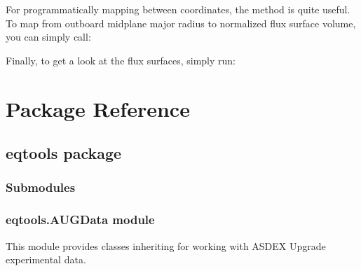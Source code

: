 \documentclass[letterpaper,10pt,english]{sphinxmanual}
\begin{document}
For programmatically mapping between coordinates, the {\hyperref[\detokenize{eqtools:eqtools.core.Equilibrium.rho2rho}]{}} method is quite useful. To map from outboard midplane major radius to normalized flux surface volume, you can simply call:

\begin{sphinxVerbatim}[commandchars=\\\{\}]
   
\end{sphinxVerbatim}

Finally, to get a look at the flux surfaces, simply run:

\begin{sphinxVerbatim}[commandchars=\\\{\}]
\end{sphinxVerbatim}


\chapter{Package Reference}
\label{\detokenize{index:package-reference}}

\section{eqtools package}
\label{\detokenize{eqtools:eqtools-package}}\label{\detokenize{eqtools::doc}}

\subsection{Submodules}
\label{\detokenize{eqtools:submodules}}

\subsection{eqtools.AUGData module}
\label{\detokenize{eqtools:module-eqtools.AUGData}}\label{\detokenize{eqtools:eqtools-augdata-module}}
This module provides classes inheriting  for
working with ASDEX Upgrade experimental data.
\end{document}

